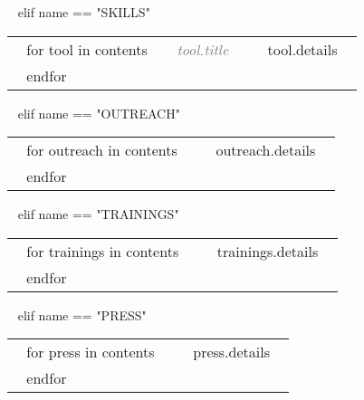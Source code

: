 \begin{minipage}{\textwidth}
%
 
~{ elif name == "SKILLS" }~

\begin{tabular}{ @{} p{} p{135mm} @{} }
  ~{ for tool in contents }~
  \small \textcolor{gray}{{\emph{~{{ tool.title }}~}}} & {\small ~{{ tool.details }}~} \\
  ~{ endfor }~
\end{tabular}

%

~{ elif name == "OUTREACH" }~

\begin{tabular}{ @{} p{} p{} @{} }
  ~{ for outreach in contents }~
  \small \textcolor{gray}{{\emph{ }}} & {\small ~{{ outreach.details }}~} \\
  ~{ endfor }~
\end{tabular}


~{ elif name == "TRAININGS" }~

\begin{tabular}{ @{} p{} p{} @{} }
  ~{ for trainings in contents }~
  \small \textcolor{gray}{{\emph{ }}} & {\small ~{{ trainings.details }}~} \\
  ~{ endfor }~
\end{tabular}

~{ elif name == "PRESS" }~

\begin{tabular}{ @{} p{} p{} @{} }
  ~{ for press in contents }~
  \small \textcolor{gray}{{\emph{ }}} & {\small ~{{ press.details }}~} \\
  ~{ endfor }~
\end{tabular}


\end{minipage}
